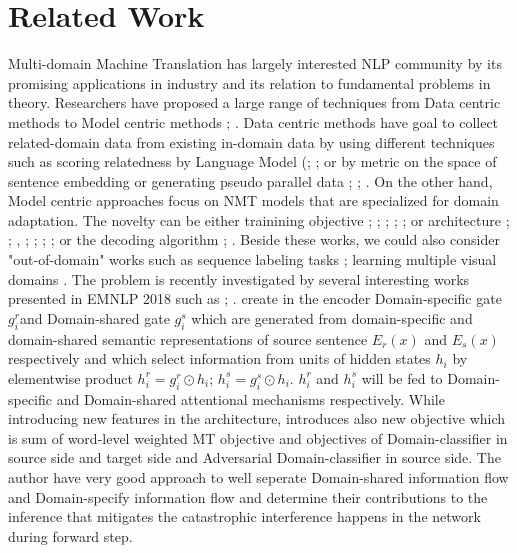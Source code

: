 \documentclass[11pt,a4paper]{article}
\begin{document}
\section{Related Work}
Multi-domain Machine Translation has largely interested NLP community by its promising applications in industry and its relation to fundamental problems in theory. Researchers have proposed a large range of techniques from Data centric methods to Model centric methods \cite{C18-1111}; \cite{P17-2061}. Data centric methods have goal to collect related-domain data from existing in-domain data by using different techniques such as scoring relatedness by Language Model (\cite{P10-2041}; \cite{D11-1033}; \cite{P13-2119} or by metric on the space of sentence embedding \cite{P17-2089} or generating pseudo parallel data \cite{P03-1010}; \cite{C16-1295}; \cite{D14-1023}. On the other hand, Model centric approaches focus on NMT models that are specialized for domain adaptation. The novelty can be either trainining objective \cite{Luong2015SNMT}; \cite{P16-1009}; \cite{D17-1155}; \cite{W17-3205}; \cite{D17-1156}; \cite{C18-1269} or architecture \cite{R17-1049}; \cite{gulcehre2016monolingual}; \cite{W17-4712}, \cite{Biao2017CARENMT}; \cite{N18-2080}; \cite{W18-6313}; \cite{C16-1170}; \cite{P18-2050} or the decoding algorithm \cite{gulcehre2016monolingual}; \cite{I17-2004}. Beside these works, we could also consider "out-of-domain" works such as sequence labeling tasks \cite{P07-1033}; learning multiple visual domains \cite{NIPS2017_6654}. The problem is recently investigated by several interesting works presented in EMNLP 2018 such as \cite{D18-1039}; \cite{D18-1041}. \cite{D18-1041} create in the encoder Domain-specific gate $g^r_i$and Domain-shared gate $g^s_i$ which are generated from domain-specific and domain-shared semantic representations of source sentence $E_r(x)$ and $E_s(x)$ respectively and which select information from units of hidden states $h_i$ by elementwise product $h^r_i = g^r_i \odot h_i$; $h^s_i = g^s_i \odot h_i$. $h^r_i$ and $h^s_i$ will be fed to Domain-specific and Domain-shared attentional mechanisms respectively. While introducing new features in the architecture, \cite{D18-1041} introduces also new objective which is sum of word-level weighted MT objective and objectives of Domain-classifier in source side and target side and Adversarial Domain-classifier in source side. The author have very good approach to well seperate Domain-shared information flow and Domain-specify information flow and determine their contributions to the inference that mitigates the catastrophic interference happens in the network during forward step. 
\end{document}
